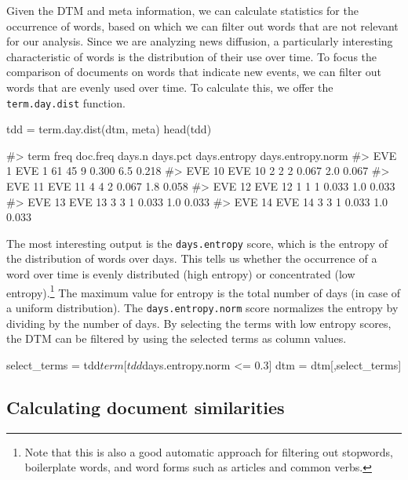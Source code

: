 Given the DTM and meta information, we can calculate statistics for the
occurrence of words, based on which we can filter out words that are not
relevant for our analysis. Since we are analyzing news diffusion, a
particularly interesting characteristic of words is the distribution of
their use over time. To focus the comparison of documents on words that
indicate new events, we can filter out words that are evenly used over
time. To calculate this, we offer the \texttt{term.day.dist} function.

\begin{Schunk}
\begin{Sinput}
tdd = term.day.dist(dtm, meta)
head(tdd)
\end{Sinput}
\begin{Soutput}
#>          term freq doc.freq days.n days.pct days.entropy days.entropy.norm
#> EVE 1   EVE 1   61       45      9    0.300          6.5             0.218
#> EVE 10 EVE 10    2        2      2    0.067          2.0             0.067
#> EVE 11 EVE 11    4        4      2    0.067          1.8             0.058
#> EVE 12 EVE 12    1        1      1    0.033          1.0             0.033
#> EVE 13 EVE 13    3        3      1    0.033          1.0             0.033
#> EVE 14 EVE 14    3        3      1    0.033          1.0             0.033
\end{Soutput}
\end{Schunk}

The most interesting output is the \texttt{days.entropy} score, which is
the entropy of the distribution of words over days. This tells us
whether the occurrence of a word over time is evenly distributed (high
entropy) or concentrated (low entropy).\footnote{Note that this is also
  a good automatic approach for filtering out stopwords, boilerplate
  words, and word forms such as articles and common verbs.} The maximum
value for entropy is the total number of days (in case of a uniform
distribution). The \texttt{days.entropy.norm} score normalizes the
entropy by dividing by the number of days. By selecting the terms with
low entropy scores, the DTM can be filtered by using the selected terms
as column values.

\begin{Schunk}
\begin{Sinput}
select_terms = tdd$term[tdd$days.entropy.norm <= 0.3]
dtm = dtm[,select_terms]
\end{Sinput}
\end{Schunk}

\subsection{Calculating document
similarities}\label{calculating-document-similarities}

